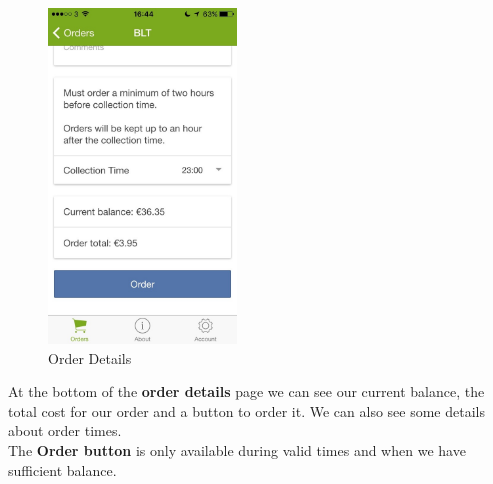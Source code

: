 \begin{minipage}{5cm}
	\begin{figure}[H]
		\includegraphics[width=5cm]{img/mobile-app/screen-shots/IMG_2909.jpg}
		\caption{Order Details}
	\end{figure}
\end{minipage} \hfill
\begin{minipage}{0.55\textwidth}
At the bottom of the \textbf{order details} page we can see our current balance, the total cost for our order and a button to order it.
We can also see some details about order times.
\\

The \textbf{Order button} is only available during valid times and when we have sufficient balance.
\end{minipage}

